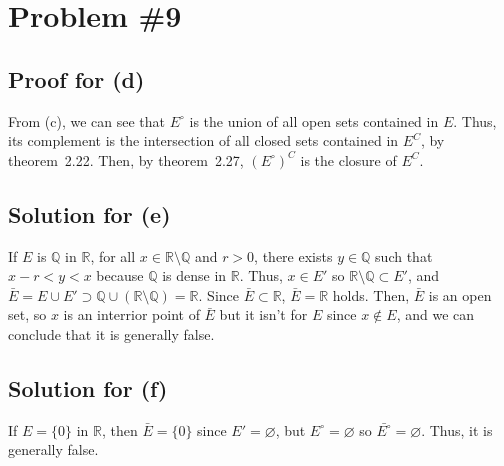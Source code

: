 \documentclass{scrartcl}
\begin{document}
\section{Problem \#9}
\subsection{Proof for (d)}
From (c), we can see that \(E^\circ\) is the union of all open sets contained in \(E\).
Thus, its complement is the intersection of all closed sets contained in \(E^C\), by theorem~2.22.
Then, by theorem~2.27, \((E^\circ)^C\) is the closure of \(E^C\).

\subsection{Solution for (e)}
If \(E\) is \(\mathbb{Q}\) in \(\mathbb{R}\), for all \(x \in \mathbb{R} \setminus \mathbb{Q}\) and \(r > 0\), there exists \(y \in \mathbb{Q}\) such that \(x - r < y < x\) because \(\mathbb{Q}\) is dense in \(\mathbb{R}\).
Thus, \(x \in E'\) so \(\mathbb{R} \setminus \mathbb{Q} \subset E'\), and \(\bar{E} = E \cup E' \supset \mathbb{Q} \cup (\mathbb{R} \setminus \mathbb{Q}) = \mathbb{R}\).
Since \(\bar{E} \subset \mathbb{R}\), \(\bar{E} = \mathbb{R}\) holds.
Then, \(\bar{E}\) is an open set, so \(x\) is an interrior point of \(\bar{E}\) but it isn't for \(E\) since \(x \not \in E\), and we can conclude that it is generally false.

\subsection{Solution for (f)}
If \(E = \{0\}\) in \(\mathbb{R}\), then \(\bar{E} = \{0\}\) since \(E' = \varnothing\), but \(E^\circ = \varnothing\) so \(\bar{E^\circ} = \varnothing\).
Thus, it is generally false.
\end{document}
